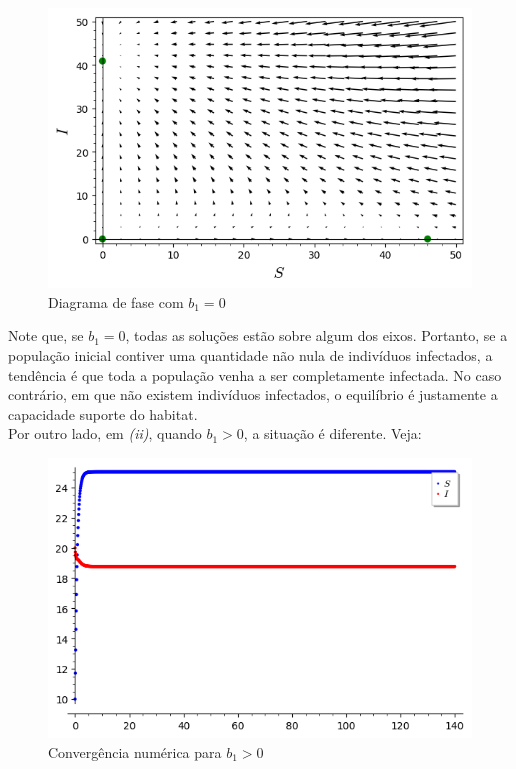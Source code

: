\documentclass{article}
\begin{document}
\begin{figure}[!h]
    \centering
     \includegraphics[width=14cm]{imagens/plot2-biologia.PNG}
    \caption{Diagrama de fase com $b_1=0$}
    \label{fig:my_label}
\end{figure}
    
\newpage
\noindent Note que, se $b_1=0$, todas as soluções estão sobre algum dos eixos. Portanto, se a população inicial contiver uma quantidade não nula de indivíduos infectados, a tendência é que toda a população venha a ser completamente infectada. No caso contrário, em que não existem indivíduos infectados, o equilíbrio é justamente a capacidade suporte do habitat.\\

\noindent Por outro lado, em \textit{(ii)}, quando $b_1>0$, a situação é diferente. Veja:

\begin{figure}[!h]
    \centering
     \includegraphics[width=14cm]{imagens/b1mzc.png}
    \caption{Convergência numérica para $b_1>0$}
    \label{fig:my_label}
\end{figure}
\end{document}

